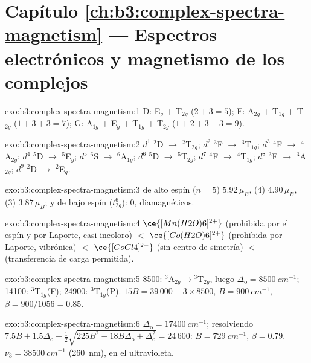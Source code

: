 \section*{Capítulo \ref{ch:b3:complex-spectra-magnetism} --- Espectros electrónicos y magnetismo de los complejos}

\begin{solution}{exo:b3:complex-spectra-magnetism:1}
D: E$_g$ + T$_{2g}$ ($2 + 3 = 5$); F: A$_{2g}$ + T$_{1g}$ + T$_{2g}$ ($1 + 3 + 3 = 7$); G: A$_{1g}$ + E$_g$ + T$_{1g}$ + T$_{2g}$
($1 + 2 + 3 + 3 = 9$).
\end{solution}

\begin{solution}{exo:b3:complex-spectra-magnetism:2}
$d^1$ $^2$D $\to$ $^2$T$_{2g}$; $d^2$ $^3$F $\to$ $^3$T$_{1g}$; $d^3$ $^4$F $\to$ $^4$A$_{2g}$; $d^4$ $^5$D $\to$ $^5$E$_g$; $d^5$ $^6$S $\to$ $^6$A$_{1g}$; $d^6$ $^5$D
$\to$ $^5$T$_{2g}$; $d^7$ $^4$F $\to$ $^4$T$_{1g}$; $d^8$ $^3$F $\to$ $^3$A$_{2g}$; $d^9$ $^2$D $\to$ $^2$E$_g$.
\end{solution}

\begin{solution}{exo:b3:complex-spectra-magnetism:3}
 de alto espín ($n = 5$) $5.92\,\mu_B$,  (4) $4.90\,\mu_B$,  (3) $3.87\,\mu_B$;  y
 de bajo espín ($t_{2g}^6$): 0, diamagnéticos.
\end{solution}

\begin{solution}{exo:b3:complex-spectra-magnetism:4}
$\ce{[Mn(H2O)6]^{2+}}$ (prohibida por el espín y por Laporte, casi incoloro) $<$ $\ce{[Co(H2O)6]^{2+}}$
(prohibida por Laporte, vibrónica) $<$ $\ce{[CoCl4]^{2-}}$ (sin centro de simetría) $<$  (transferencia
de carga permitida).
\end{solution}

\begin{solution}{exo:b3:complex-spectra-magnetism:5}
8500: $^3$A$_{2g}\to{}^3$T$_{2g}$, luego $\Delta_{\mathrm o} = \qty{8500}{cm^{-1}}$; 14100: $^3$T$_{1g}$(F); 24900: $^3$T$_{1g}$(P).
$15B = 39\,000 - 3 \times 8500$, $B = \qty{900}{cm^{-1}}$, $\beta = 900/1056 = 0.85$.
\end{solution}

\begin{solution}{exo:b3:complex-spectra-magnetism:6}
$\Delta_{\mathrm o} = \qty{17400}{cm^{-1}}$; resolviendo $7.5B + 1.5\Delta_{\mathrm o} - \frac12\sqrt{225B^2 - 18B\Delta_{\mathrm o} + \Delta_{\mathrm o}^2} = 24\,600$: $B = \qty{729}{cm^{-1}}$,
$\beta = 0.79$. $\nu_3 = \qty{38500}{cm^{-1}}$ (\qty{260}{nm}), en el ultravioleta.
\end{solution}


